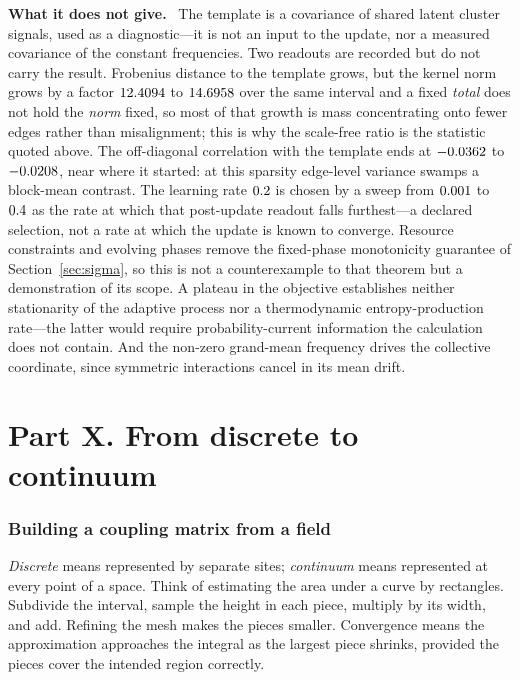 \documentclass[11pt]{article}
\newcommand{\scope}{\par\smallskip\noindent\textbf{What it does not give.}\ }
\begin{document}
\scope
The template is a covariance of shared latent cluster signals, used as a
diagnostic---it is not an input to the update, nor a measured covariance of
the constant frequencies. Two readouts are recorded but do not carry the
result. Frobenius distance to the template grows, but the kernel norm grows by
a factor $12.4094$ to $14.6958$ over the same
interval and a fixed \emph{total} does not hold the \emph{norm} fixed, so most
of that growth is mass concentrating onto fewer edges rather than misalignment;
this is why the scale-free ratio is the statistic quoted above. The
off-diagonal correlation with the template ends at
$-0.0362$ to $-0.0208$, near where it
started: at this sparsity edge-level variance swamps a block-mean contrast. The
learning rate $0.2$ is chosen by a sweep from
$0.001$ to $0.4$ as the rate at which
that post-update readout falls furthest---a declared selection, not a rate at
which the update is known to converge. Resource constraints and evolving phases remove the
fixed-phase monotonicity guarantee of Section~\ref{sec:sigma}, so this is not a
counterexample to that theorem but a demonstration of its scope. A plateau in
the objective establishes neither stationarity of the adaptive process nor a
thermodynamic entropy-production rate---the latter would require
probability-current information the calculation does not contain. And the
non-zero grand-mean frequency drives the collective coordinate, since symmetric
interactions cancel in its mean drift.

\part*{Part X. From discrete to continuum}
\section{Building a coupling matrix from a field}

\emph{Discrete} means represented by separate sites; \emph{continuum} means
represented at every point of a space. Think of estimating the area under a
curve by rectangles. Subdivide the interval, sample the height in each piece,
multiply by its width, and add. Refining the mesh makes the pieces smaller.
Convergence means the approximation approaches the integral as the largest
piece shrinks, provided the pieces cover the intended region correctly.
\end{document}
